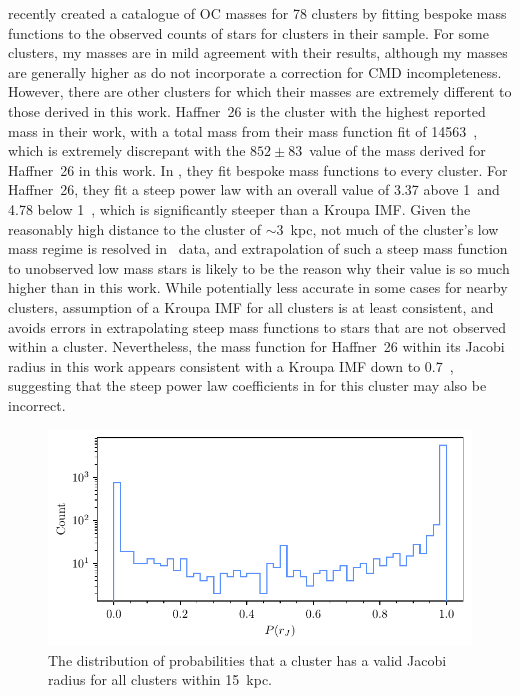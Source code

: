 \cite{cordoni_photometric_binaries_2023} recently created a catalogue of OC masses for 78 clusters by fitting bespoke mass functions to the observed counts of stars for clusters in their sample. For some clusters, my masses are in mild agreement with their results, although my masses are generally higher as \cite{cordoni_photometric_binaries_2023} do not incorporate a correction for CMD incompleteness. However, there are other clusters for which their masses are extremely different to those derived in this work. Haffner~26 is the cluster with the highest reported mass in their work, with a total mass from their mass function fit of 14563~\MSun, which is extremely discrepant with the $852\pm83$~\MSun value of the mass derived for Haffner~26 in this work. In \cite{cordoni_photometric_binaries_2023}, they fit bespoke mass functions to every cluster. For Haffner~26, they fit a steep power law with an overall value of 3.37 above 1~\MSun and 4.78 below 1~\MSun, which is significantly steeper than a Kroupa IMF. Given the reasonably high distance to the cluster of $\sim 3$~kpc, not much of the cluster's low mass regime is resolved in \gaia\ data, and extrapolation of such a steep mass function to unobserved low mass stars is likely to be the reason why their value is so much higher than in this work. While potentially less accurate in some cases for nearby clusters, assumption of a Kroupa IMF for all clusters is at least consistent, and avoids errors in extrapolating steep mass functions to stars that are not observed within a cluster. Nevertheless, the mass function for Haffner~26 within its Jacobi radius in this work appears consistent with a Kroupa IMF down to 0.7~\MSun, suggesting that the steep power law coefficients in \cite{cordoni_photometric_binaries_2023} for this cluster may also be incorrect.

\begin{figure}[t]
    \centering
    \includegraphics[width=\textwidth]{fig/c4/results_p_jac_distribution.pdf}
    \caption[The distribution of probabilities that a cluster has a valid Jacobi radius]{The distribution of probabilities that a cluster has a valid Jacobi radius for all clusters within 15~kpc.}
    \label{fig:dynamics:results:jacobi_radii_distribution}
\end{figure}

